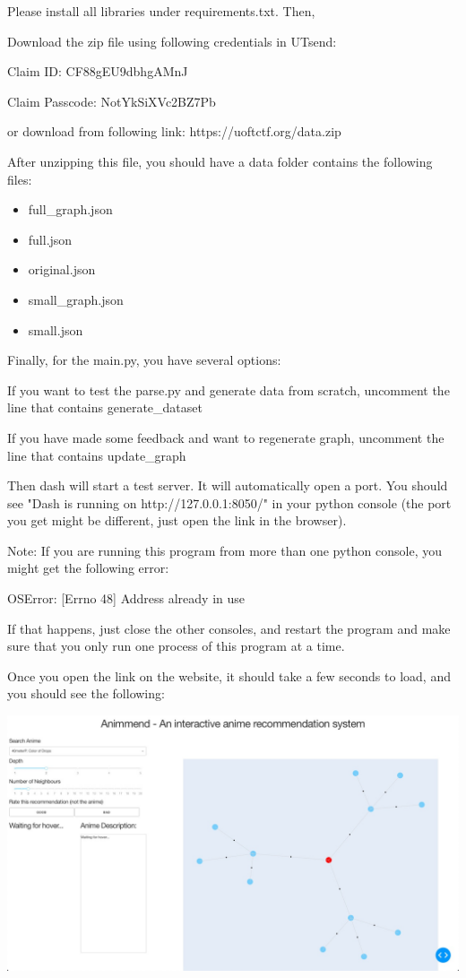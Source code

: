 \documentclass[12pt]{article}
\begin{document}
\begin{enumerate}
\begin{text}
Please install all libraries under requirements.txt. Then,

Download the zip file using following credentials in UTsend:

Claim ID: CF88gEU9dbhgAMnJ

Claim Passcode: NotYkSiXVc2BZ7Pb

or download from following link: https://uoftctf.org/data.zip

After unzipping this file, you should have a data folder contains the following files:

\begin{itemize}
    \item full\_graph.json
    \item full.json
    \item original.json
    \item small\_graph.json
    \item small.json
\end{itemize}

Finally, for the main.py, you have several options: 

If you want to test the parse.py and generate data from scratch, uncomment the line that contains generate\_dataset

If you have made some feedback and want to regenerate graph, uncomment the line that contains update\_graph

Then dash will start a test server. It will automatically open a port. You should see "Dash is running on http://127.0.0.1:8050/" in your python console (the port you get might be different, just open the link in the browser).

Note: If you are running this program from more than one python console, you might get the following error:

OSError: [Errno 48] Address already in use

If that happens, just close the other consoles, and restart the program and make sure that you only run one process of this program at a time.

Once you open the link on the website, it should take a few seconds to load, and you should see the following:

\includegraphics[scale=0.3]{initial.jpg}


\end{text}
\end{enumerate}
\end{document}
